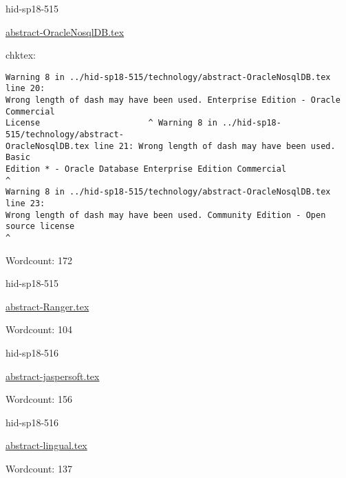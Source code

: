 \begin{IU}

hid-sp18-515

\href{https://github.com/cloudmesh-community/hid-sp18-515/blob/master//technology/abstract-OracleNosqlDB.tex}{abstract-OracleNosqlDB.tex}

 
chktex:
\begin{tiny}
\begin{verbatim}
Warning 8 in ../hid-sp18-515/technology/abstract-OracleNosqlDB.tex line 20:
Wrong length of dash may have been used. Enterprise Edition - Oracle Commercial
License                      ^ Warning 8 in ../hid-sp18-515/technology/abstract-
OracleNosqlDB.tex line 21: Wrong length of dash may have been used. Basic
Edition * - Oracle Database Enterprise Edition Commercial                    ^
Warning 8 in ../hid-sp18-515/technology/abstract-OracleNosqlDB.tex line 23:
Wrong length of dash may have been used. Community Edition - Open source license
^
\end{verbatim}
\end{tiny}

Wordcount: 172

\end{IU}



\begin{IU}

hid-sp18-515

\href{https://github.com/cloudmesh-community/hid-sp18-515/blob/master//technology/abstract-Ranger.tex}{abstract-Ranger.tex}

 

Wordcount: 104

\end{IU}



\begin{IU}

hid-sp18-516

\href{https://github.com/cloudmesh-community/hid-sp18-516/blob/master//technology/abstract-jaspersoft.tex}{abstract-jaspersoft.tex}

 

Wordcount: 156

\end{IU}



\begin{IU}

hid-sp18-516

\href{https://github.com/cloudmesh-community/hid-sp18-516/blob/master//technology/abstract-lingual.tex}{abstract-lingual.tex}

 

Wordcount: 137

\end{IU}


